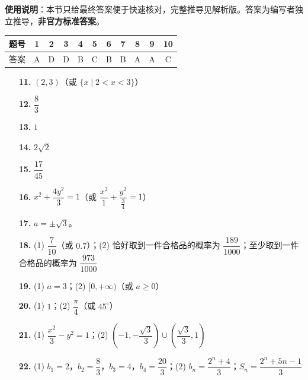 
\begin{gknotice}
\textbf{使用说明}：本节只给最终答案便于快速核对，完整推导见解析版。答案为编写者独立推导，\textbf{非官方标准答案}。
\end{gknotice}

\begin{center}\begin{tabular}{ccccccccccc}
\toprule
题号 & 1 & 2 & 3 & 4 & 5 & 6 & 7 & 8 & 9 & 10 \\
\midrule
答案 & A & D & D & B & C & B & B & A & A & C \\
\bottomrule
\end{tabular}\end{center}

\begin{itemize}[leftmargin=2.6em]
  \item[\textbf{11.}] $(2, 3)$（或 $\{x \mid 2 < x < 3\}$）
  \item[\textbf{12.}] $\dfrac{8}{3}$
  \item[\textbf{13.}] $1$
  \item[\textbf{14.}] $2\sqrt{2}$
  \item[\textbf{15.}] $\dfrac{17}{45}$
  \item[\textbf{16.}] $x^2 + \dfrac{4y^2}{3} = 1$（或 $\dfrac{x^2}{1} + \dfrac{y^2}{\frac{3}{4}} = 1$）
\end{itemize}

\begin{itemize}[leftmargin=2.6em]
  \item[\textbf{17.}] $a = \pm\sqrt{3}$。
  \item[\textbf{18.}] (1) $\dfrac{7}{10}$（或 $0.7$）；(2) 恰好取到一件合格品的概率为 $\dfrac{189}{1000}$；至少取到一件合格品的概率为 $\dfrac{973}{1000}$
  \item[\textbf{19.}] (1) $a = 3$；(2) $[0, +\infty)$（或 $a \geqslant 0$）
  \item[\textbf{20.}] (1) $1$；(2) $\dfrac{\pi}{4}$（或 $45^\circ$）
  \item[\textbf{21.}] (1) $\dfrac{x^2}{3} - y^2 = 1$；(2) $\left(-1, -\dfrac{\sqrt{3}}{3}\right) \cup \left(\dfrac{\sqrt{3}}{3}, 1\right)$
  \item[\textbf{22.}] (1) $b_1 = 2$，$b_2 = \dfrac{8}{3}$，$b_3 = 4$，$b_4 = \dfrac{20}{3}$；(2) $b_n = \dfrac{2^n + 4}{3}$；$S_n = \dfrac{2^n + 5n - 1}{3}$
\end{itemize}
